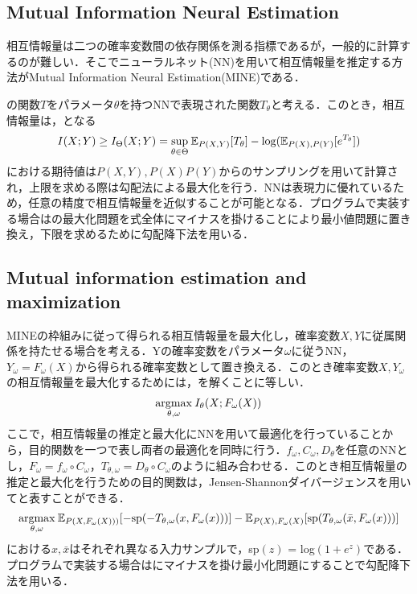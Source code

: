 \subsection{Mutual Information Neural Estimation}
相互情報量は二つの確率変数間の依存関係を測る指標であるが，一般的に計算するのが難しい．そこでニューラルネット(NN)を用いて相互情報量を推定する方法がMutual Information Neural Estimation(MINE)である\cite{MINE}．

の関数$T$をパラメータ$\theta$を持つNNで表現された関数$T_{\theta}$と考える．このとき，相互情報量は，となる
\begin{eqnarray}
	I(X;Y) \geq I_{\Theta}(X;Y) = \underset{\theta \in \Theta}{\rm sup}\: \mathbb E_{P(X,Y)}[T_{\theta}] - {\rm log}(\mathbb E_{P(X), P(Y)}[e^{T_{\theta}}]) \label{eq:mine}
\end{eqnarray}
における期待値は$P(X, Y), P(X)P(Y)$からのサンプリングを用いて計算され，上限を求める際は勾配法による最大化を行う．NNは表現力に優れているため，任意の精度で相互情報量を近似することが可能となる．プログラムで実装する場合はの最大化問題を式全体にマイナスを掛けることにより最小値問題に置き換え，下限を求めるために勾配降下法を用いる．

\subsection{Mutual information estimation and maximization}
MINEの枠組みに従って得られる相互情報量を最大化し，確率変数$X, Y$に従属関係を持たせる場合を考える．Yの確率変数をパラメータ$\omega$に従うNN，$Y_{\omega}=F_{\omega}(X)$から得られる確率変数として置き換える．このとき確率変数$X, Y_{\omega}$の相互情報量を最大化するためには，を解くことに等しい．
\begin{eqnarray}
	\underset{\theta, \omega}{\rm argmax}\: I_{\theta}(X;F_{\omega}(X)) \label{eq:infomax}
\end{eqnarray}
ここで，相互情報量の推定と最大化にNNを用いて最適化を行っていることから，目的関数を一つで表し両者の最適化を同時に行う．$f_{\omega}, C_{\omega}, D_{\theta}$を任意のNNとし，$F_{\omega} = f_{\omega}\circ C_{\omega}$，$T_{\theta, \omega} = D_{\theta} \circ C_{\omega}$のように組み合わせる．このとき相互情報量の推定と最大化を行うための目的関数は，Jensen-Shannonダイバージェンスを用いてと表すことができる\cite{deepinfomax}．
\begin{eqnarray}
	 \underset{\theta, \omega}{\rm argmax} \: \mathbb E_{P(X, F_{\omega}(X)))} [-{\rm sp}(-T_{\theta, \omega}(x, F_{\omega}(x)))] - \mathbb E_{P(X), F_{\omega}(X)} [{\rm sp}(T_{\theta, \omega}(\bar x, F_{\omega}(x)))] \label{eq:deepinfomax}
\end{eqnarray}
における$x, \bar x$はそれぞれ異なる入力サンプルで，sp$(z)$ = log$(1+e^z)$である．プログラムで実装する場合はにマイナスを掛け最小化問題にすることで勾配降下法を用いる．
